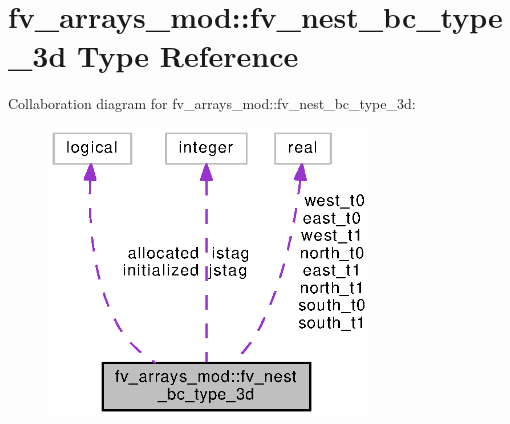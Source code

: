 \section{fv\-\_\-arrays\-\_\-mod\-:\-:fv\-\_\-nest\-\_\-bc\-\_\-type\-\_\-3d Type Reference}
\label{structfv__arrays__mod_1_1fv__nest__bc__type__3d}


Collaboration diagram for fv\-\_\-arrays\-\_\-mod\-:\-:fv\-\_\-nest\-\_\-bc\-\_\-type\-\_\-3d\-:
\nopagebreak
\begin{figure}[H]
\begin{center}
\leavevmode
\includegraphics[width=241pt]{structfv__arrays__mod_1_1fv__nest__bc__type__3d__coll__graph}
\end{center}
\end{figure}
